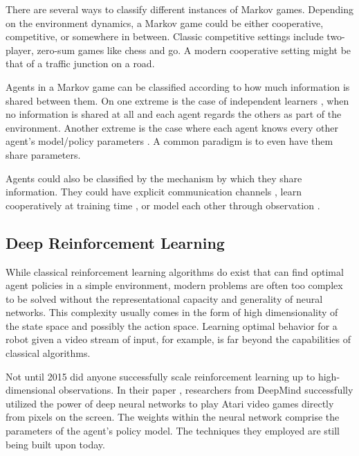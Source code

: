 \documentclass[11pt,journal,compsoc]{IEEEtran}
\begin{document}
	There are several ways to classify different instances of Markov games. Depending on the environment dynamics, a Markov game could be either cooperative, competitive, or somewhere in between. Classic competitive settings include two-player, zero-sum games like chess and go. A modern cooperative setting might be that of a traffic junction on a road. 
	
	Agents in a Markov game can be classified according to how much information is shared between them. On one extreme is the case of independent learners \cite{bansal_mujoco}\!\cite{leibo_social_dilemmas}\!\cite{tampuu_pong}, when no information is shared at all and each agent regards the others as part of the environment. Another extreme is the case where each agent knows every other agent's model/policy parameters \cite{lola}. A common paradigm is to even have them share parameters.
	
	Agents could also be classified by the mechanism by which they share information. They could have explicit communication channels \cite{sukhbaatar_commnet}\!\cite{foerster_dial}\!\cite{peng_bicnet}, learn cooperatively at training time \cite{lowe_maddpg}\!\cite{foerster_coma}\!\cite{rashid_qmix}, or model each other through observation \cite{raileanu_som}\!\cite{hong_dpiqn}\!\cite{mtom}. 
	
	\subsection{Deep Reinforcement Learning}
	While classical reinforcement learning algorithms do exist that can find optimal agent policies in a simple environment, modern problems are often too complex to be solved without the representational capacity and generality of neural networks. This complexity usually comes in the form of high dimensionality of the state space and possibly the action space. Learning optimal behavior for a robot given a video stream of input, for example, is far beyond the capabilities of classical algorithms.
	
	Not until 2015 did anyone successfully scale reinforcement learning up to high-dimensional observations. In their paper \cite{dqn}, researchers from DeepMind successfully utilized the power of deep neural networks to play Atari video games directly from pixels on the screen. The weights within the neural network comprise the parameters of the agent's policy model. The techniques they employed are still being built upon today.
	
\end{document}
